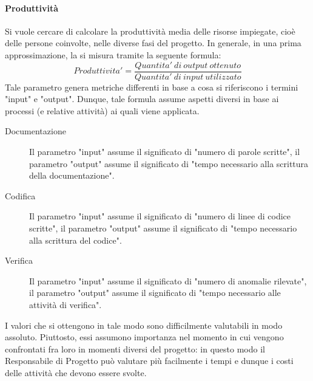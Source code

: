 				\paragraph{Produttività}
					Si vuole cercare di calcolare la produttività media delle risorse impiegate, cioè delle persone coinvolte, nelle diverse fasi del 
					progetto. In generale, in una prima approssimazione, la si misura tramite la seguente formula:
					\begin{equation}
						Produttivita' = \frac{Quantita'\ di\ output\ ottenuto}{Quantita'\ di\ input\ utilizzato}
						\label{Produttività}
					\end{equation}
					Tale parametro genera metriche differenti in base a cosa si riferiscono i termini "input" e "output". Dunque, tale formula assume 
					aspetti diversi in base ai processi (e relative attività) ai quali viene applicata.
					\begin{description}
						\item[Documentazione] Il parametro "input" assume il significato di "numero di parole scritte", il parametro "output" assume il 
						significato di "tempo necessario alla scrittura della documentazione".
						\item[Codifica] Il parametro "input" assume il significato di "numero di linee di codice scritte", il parametro "output" assume 
						il significato di "tempo necessario alla scrittura del codice".
						\item[Verifica] Il parametro "input" assume il significato di "numero di anomalie rilevate", il parametro "output" assume il 
						significato di "tempo necessario alle attività di verifica".
					\end{description}
					I valori che si ottengono in tale modo sono difficilmente valutabili in modo assoluto. Piuttosto, essi assumono importanza nel 
					momento in cui vengono confrontati fra loro in momenti diversi del progetto: in questo modo il Responsabile di Progetto può valutare 
					più facilmente i tempi e dunque i costi delle attività che devono essere svolte.
